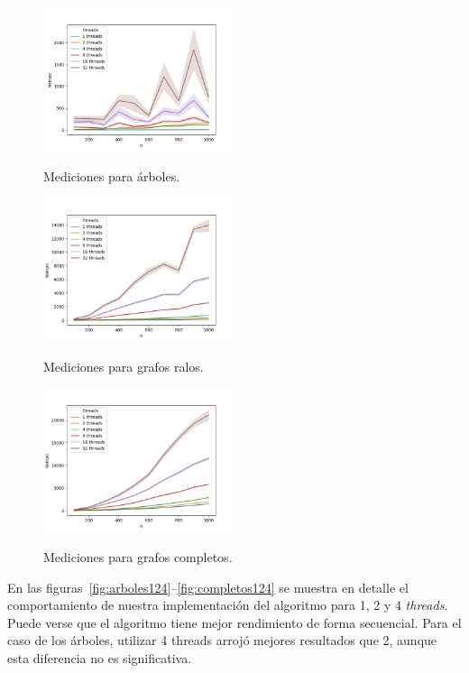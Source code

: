 \begin{figure}[h]
\caption{Mediciones para árboles.}
\centering
\includegraphics[width=0.5\textwidth]{imagenes/arbol.png} \\%
\label{fig:arboles}
\end{figure}

\begin{figure}[h]
\caption{Mediciones para grafos ralos.}
\centering
\includegraphics[width=0.5\textwidth]{imagenes/ralo.png} \\%
\label{fig:ralos}
\end{figure}

\begin{figure}[h]
\caption{Mediciones para grafos completos.}
\centering
\includegraphics[width=0.5\textwidth]{imagenes/completo.png} \\%
\label{fig:completos}
\end{figure}


En las figuras~\ref{fig:arboles124}--\ref{fig:completos124} se muestra en
detalle el comportamiento de nuestra implementación del algoritmo para 1, 2 y 4
\textit{threads}. Puede verse que el algoritmo tiene mejor rendimiento de forma
secuencial. Para el caso de los árboles, utilizar 4 threads arrojó
mejores resultados que 2, aunque esta diferencia no es significativa.

